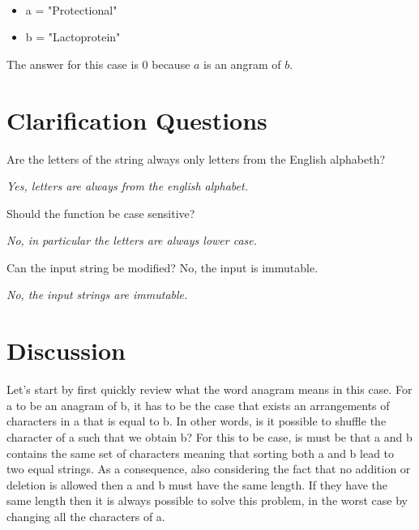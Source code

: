 \begin{example}
	\hfill \\
	\begin{itemize}
		\item[] 	a = "Protectional"
		\item[] 	b = "Lactoprotein"
	\end{itemize}
	 The answer for this case is $0$ because $a$ is an angram of $b$.

\end{example}


\section{Clarification Questions}

\begin{QandA}
	\item Are the letters of the string always only letters from the English alphabeth? 
	\begin{answered}
		\textit{Yes, letters are always from the english alphabet.}
	\end{answered}
	
	\item Should the function be case sensitive? 
	\begin{answered}
		\textit{No, in particular the letters are always lower case.}
	\end{answered}
	\item Can the input string be modified? No, the input is immutable.
	\begin{answered}
		\textit{No, the input strings are immutable.}
	\end{answered}
\end{QandA}

\section{Discussion}
Let's start by first quickly review what the word anagram means in this case. For a to be an anagram of b, it has to be the case that exists an arrangements of characters in a that is equal to b. In other words, is it possible to shuffle the character of a such that we obtain b? For this to be case, is must be that a and b contains the same set of characters meaning that sorting both a and b lead to two equal strings. As a consequence, also considering the  fact that no addition or deletion is allowed then a and b must have the same length. If they have the same length then it is always possible to solve this problem, in the worst case by changing all the characters of a.

